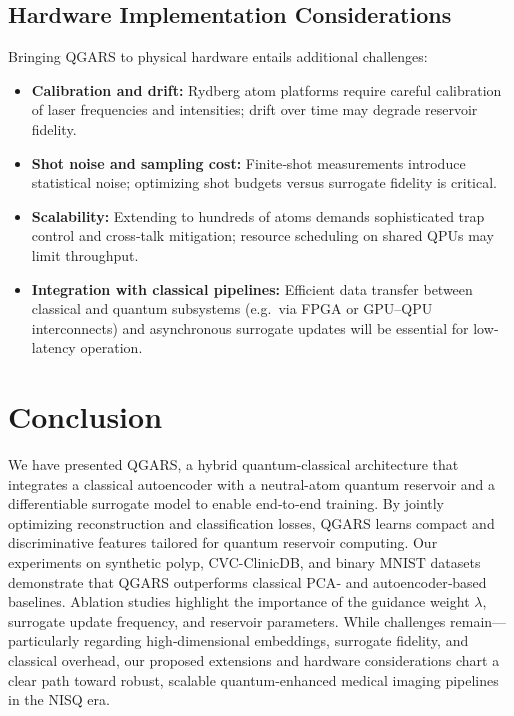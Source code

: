 \documentclass[conference]{IEEEtran}
\begin{document}
\subsection{Hardware Implementation Considerations}
Bringing QGARS to physical hardware entails additional challenges:
\begin{itemize}
    \item \textbf{Calibration and drift:}  
        Rydberg atom platforms require careful calibration of laser frequencies and intensities; drift over time may degrade reservoir fidelity.
    \item \textbf{Shot noise and sampling cost:}  
        Finite‐shot measurements introduce statistical noise; optimizing shot budgets versus surrogate fidelity is critical.
    \item \textbf{Scalability:}  
        Extending to hundreds of atoms demands sophisticated trap control and cross‐talk mitigation; resource scheduling on shared QPUs may limit throughput.
    \item \textbf{Integration with classical pipelines:}  
        Efficient data transfer between classical and quantum subsystems (e.g.\ via FPGA or GPU–QPU interconnects) and asynchronous surrogate updates will be essential for low‐latency operation.
\end{itemize}

\section{Conclusion}

We have presented QGARS, a hybrid quantum-classical architecture that integrates a classical autoencoder with a neutral-atom quantum reservoir and a differentiable surrogate model to enable end‐to‐end training. By jointly optimizing reconstruction and classification losses, QGARS learns compact and discriminative features tailored for quantum reservoir computing. Our experiments on synthetic polyp, CVC-ClinicDB, and binary MNIST datasets demonstrate that QGARS outperforms classical PCA‐ and autoencoder‐based baselines. Ablation studies highlight the importance of the guidance weight \(\lambda\), surrogate update frequency, and reservoir parameters. While challenges remain—particularly regarding high‐dimensional embeddings, surrogate fidelity, and classical overhead, our proposed extensions and hardware considerations chart a clear path toward robust, scalable quantum‐enhanced medical imaging pipelines in the NISQ era.





\end{document}
